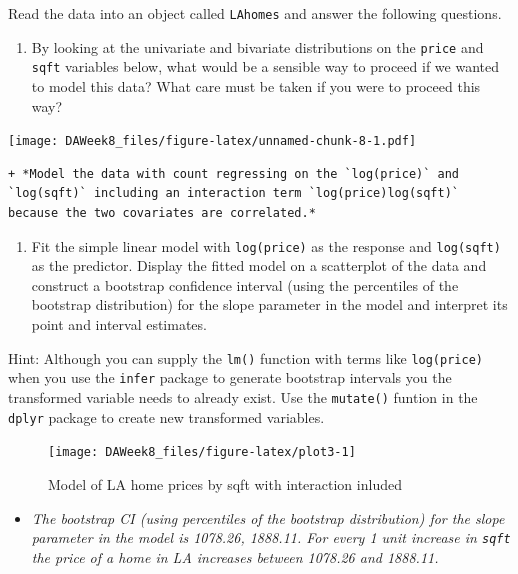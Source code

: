 \documentclass[]{article}
\providecommand{\tightlist}{%
  \setlength{\itemsep}{0pt}\setlength{\parskip}{0pt}}
\begin{document}
Read the data into an object called \texttt{LAhomes} and answer the
following questions.

\begin{enumerate}
\def\labelenumi{\alph{enumi}.}
\tightlist
\item
  By looking at the univariate and bivariate distributions on the
  \texttt{price} and \texttt{sqft} variables below, what would be a
  sensible way to proceed if we wanted to model this data? What care
  must be taken if you were to proceed this way?
\end{enumerate}

\texttt{[image: DAWeek8\_files/figure-latex/unnamed-chunk-8-1.pdf]}

\begin{verbatim}
+ *Model the data with count regressing on the `log(price)` and `log(sqft)` including an interaction term `log(price)log(sqft)` because the two covariates are correlated.*  
\end{verbatim}

\begin{enumerate}
\def\labelenumi{\alph{enumi}.}
\setcounter{enumi}{1}
\tightlist
\item
  Fit the simple linear model with \texttt{log(price)} as the response
  and \texttt{log(sqft)} as the predictor. Display the fitted model on a
  scatterplot of the data and construct a bootstrap confidence interval
  (using the percentiles of the bootstrap distribution) for the slope
  parameter in the model and interpret its point and interval estimates.
\end{enumerate}

Hint: Although you can supply the \texttt{lm()} function with terms like
\texttt{log(price)} when you use the \texttt{infer} package to generate
bootstrap intervals you the transformed variable needs to already exist.
Use the \texttt{mutate()} funtion in the \texttt{dplyr} package to
create new transformed variables.

\begin{figure}[H]

{\centering \texttt{[image: DAWeek8\_files/figure-latex/plot3-1]} 

}

\caption{\label{fig:plot3}Model of LA home prices by sqft with interaction inluded}\label{fig:plot3}
\end{figure}

\begin{itemize}
\tightlist
\item
  \emph{The bootstrap CI (using percentiles of the bootstrap
  distribution) for the slope parameter in the model is 1078.26,
  1888.11. For every 1 unit increase in \texttt{sqft} the price of a
  home in LA increases between 1078.26 and 1888.11.}
\end{itemize}
\end{document}
